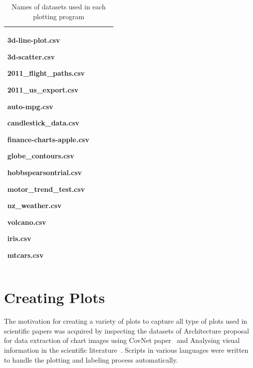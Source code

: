 \documentclass[12pt, a4paper,oneside]{report}
\begin{document}
\begin{table}[!htbp]
\begin{adjustbox}{max width=1.1\textwidth,center}
\begin{tabular}{|p{4cm}|p{3cm}|p{3cm}|p{4cm}|}
		3d-line-plot.csv \par 3d-scatter.csv \par 2011\_flight\_paths.csv \par 2011\_us\_export.csv \par auto-mpg.csv \par candlestick\_data.csv \par finance-charts-apple.csv \par 
		globe\_contours.csv\par hobbspearsontrial.csv \par motor\_trend\_test.csv \par 
		nz\_weather.csv \par volcano.csv \par iris.csv \par mtcars.csv	\\ \hline
		
	\end{tabular}
	
\end{adjustbox}

\caption {Names of datasets used in each plotting program}	
\label{table:1}
\end{table}


\section{Creating Plots}
The motivation for creating a variety of plots to capture all type of plots used in scientific papers was acquired by inspecting the datasets of Architecture proposal for data extraction of chart images using CovNet paper~\cite{junior2017archi} and Analysing visual information in the scientific literature~\cite{lee2018viziometrics}. Scripts in various languages were written to handle the plotting and labeling process automatically. 
\end{document}
